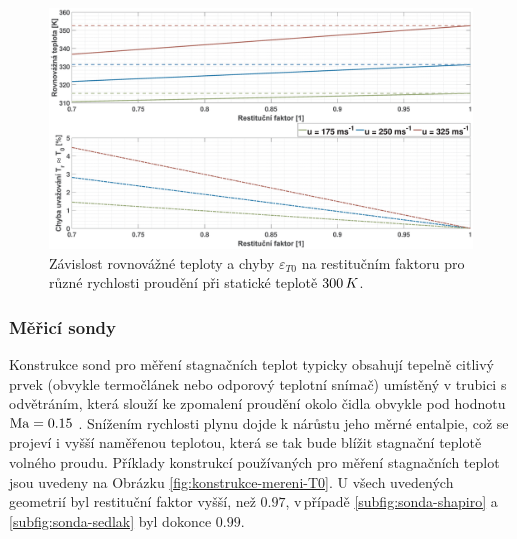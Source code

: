             \begin{figure}[ht!]
                \centering
                \includegraphics*[width=\textwidth, trim = {6cm 0cm 6cm 0cm}]{100_MERENI_TEPLOT/chyba_Tr_T0.eps}
                \caption{Závislost rovnovážné teploty a chyby $\varepsilon _{T0}$ na restitučním faktoru pro různé rychlosti proudění při statické teplotě $300 \, K$.}
                \label{fig:chyba-Tr-T0}
            \end{figure}

        \subsubsection{Měřicí sondy}
            Konstrukce sond pro měření stagnačních teplot typicky obsahují tepelně citlivý prvek (obvykle termočlánek nebo odporový teplotní snímač) umístěný v trubici s\,odvětráním, která slouží ke zpomalení proudění okolo čidla obvykle pod hodnotu \linebreak $\textrm{Ma} = 0.15$ \cite{Bonham2013}. Snížením rychlosti plynu dojde k nárůstu jeho měrné entalpie, což se projeví i vyšší naměřenou teplotou, která se tak bude blížit stagnační teplotě volného proudu. Příklady konstrukcí používaných pro měření stagnačních teplot jsou uvedeny na Obrázku \ref{fig:konstrukce-mereni-T0}. U všech uvedených geometrií byl restituční faktor vyšší, než $0.97$, v\,případě \ref{subfig:sonda-shapiro} a \ref{subfig:sonda-sedlak} byl dokonce $0.99$.

